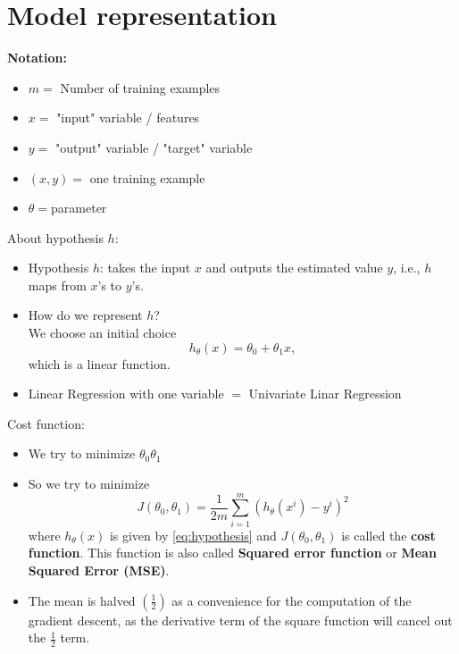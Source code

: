 \documentclass[a4paper,11pt]{article}
\begin{document}
  \section{Model representation}
  \textbf{Notation:}
  \begin{itemize}
    \item $m=$ Number of training examples
    \item $x=$ "input" variable / features
    \item $y=$ "output" variable / "target" variable
    \item $(x,y)=$ one training example
    \item $\theta=$parameter
  \end{itemize}
  About hypothesis $h$:
  \begin{itemize}
    \item Hypothesis $h$: takes the input $x$ and outputs the estimated value $y$, i.e., $h$ maps from $x$'s to $y$'s.
    \item How do we represent $h$? \\
    We choose an initial choice
    \begin{equation}
    h_\theta (x)=\theta_0 +\theta_1 x  ,
    \label{eq:hypothesis}
    \end{equation}
    which is a linear function.
    \item Linear Regression with one variable $=$ Univariate Linar Regression
  \end{itemize}
  Cost function:
  \begin{itemize}
    \item We try to minimize $\theta_0 \theta_1$
    \item So we try to minimize
    \begin{equation}
    J(\theta_0, \theta_1)=\frac{1}{2m}\sum_{i=1}^m \left(h_\theta (x^i) - y^i\right)^2
  \end{equation}
  where $h_\theta (x)$ is given by \ref{eq:hypothesis} and $J(\theta_0, \theta_1)$ is called the \textbf{cost function}. This function is also called \textbf{Squared error function} or \textbf{Mean Squared Error (MSE)}.
  \item The mean is halved $(\frac{1}{2})$ as a convenience for the computation of the gradient descent, as the derivative term of the square function will cancel out the $\frac{1}{2}$ term.
  \end{itemize}
\end{document}
